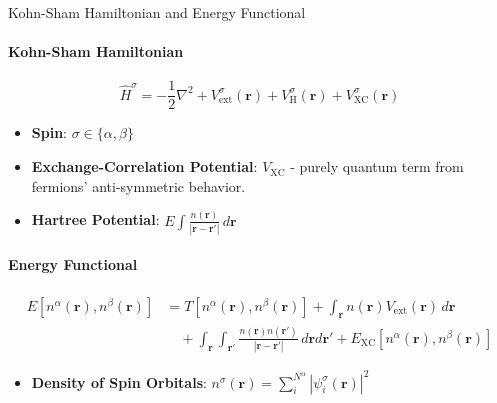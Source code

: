 \documentclass{beamer}
\begin{document}
\begin{frame}{Kohn-Sham Hamiltonian and Energy Functional}
	\framesubtitle{Kohn-Sham Hamiltonian}
	\[
	\hat{H}^\sigma = -\frac{1}{2} \nabla^2 + V^\sigma_{\text{ext}}(\mathbf{r}) + V^\sigma_{\text{H}}(\mathbf{r}) + V^\sigma_{\text{XC}}(\mathbf{r})
	\]
	\begin{itemize}
		\item \textbf{Spin}: $\sigma \in \{\alpha, \beta\}$
		\item \textbf{Exchange-Correlation Potential}: $V_{\text{XC}}$ - purely quantum term from fermions' anti-symmetric behavior.
		\item \textbf{Hartree Potential}: $E\int \frac{n(\mathbf{r})}{|\mathbf{r} - \mathbf{r'}|} \, d\mathbf{r}$
	\end{itemize}
	\framesubtitle{Energy Functional}
	\[
	\begin{aligned}
		E[n^\alpha(\mathbf{r}), n^\beta(\mathbf{r})] &= T[n^\alpha(\mathbf{r}), n^\beta(\mathbf{r})] + \int_{\mathbf{r}} n(\mathbf{r}) V_{\text{ext}}(\mathbf{r}) \, d\mathbf{r} \\
		&\quad + \int_{\mathbf{r}}\int_{\mathbf{r'}} \frac{n(\mathbf{r})n(\mathbf{r'})}{|\mathbf{r} - \mathbf{r'}|}\, d\mathbf{r} d\mathbf{r'} + E_{\text{XC}}[n^\alpha(\mathbf{r}), n^\beta(\mathbf{r})]
	\end{aligned}
	\]
	\begin{itemize}
		\item \textbf{Density of Spin Orbitals}: $n^\sigma(\mathbf{r}) = \sum_i^{N^\alpha} |\psi^\sigma_i(\mathbf{r})|^2$
	\end{itemize}
\end{frame}
\end{document}
